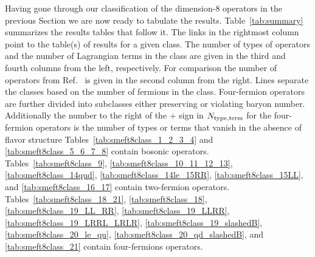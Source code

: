 Having gone through our classification of the dimension-8 operators in the previous Section we are now ready to tabulate the results.
Table~\ref{tab:summary} summarizes the results tables that follow it.
The links in the rightmost column point to the table(s) of results for a given class.
The number of types of operators and the number of Lagrangian terms in the class are given in the third and fourth columns from the left, respectively.
For comparison the number of operators from Ref.~\cite{Henning:2015alf} is given in the second column from the right.
Lines separate the classes based on the number of fermions in the class. 
Four-fermion operators are further divided into subclasses either preserving or violating baryon number.
Additionally the number to the right of the $+$ sign in $N_{\rm type, term}$ for the four-fermion operators is the number of types or terms that vanish in the absence of flavor structure
Tables~\ref{tab:smeft8class_1_2_3_4} and \ref{tab:smeft8class_5_6_7_8} contain bosonic operators.
Tables~\ref{tab:smeft8class_9}, \ref{tab:smeft8class_10_11_12_13}, \ref{tab:smeft8class_14qud}, \ref{tab:smeft8class_14le_15RR}, \ref{tab:smeft8class_15LL}, and \ref{tab:smeft8class_16_17} contain two-fermion operators.
Tables~\ref{tab:smeft8class_18_21}, \ref{tab:smeft8class_18},  \ref{tab:smeft8class_19_LL_RR}, \ref{tab:smeft8class_19_LLRR}, \ref{tab:smeft8class_19_LRRL_LRLR}, \ref{tab:smeft8class_19_slashedB}, \ref{tab:smeft8class_20_le_qu}, \ref{tab:smeft8class_20_qd_slashedB}, and \ref{tab:smeft8class_21} contain four-fermions operators.

